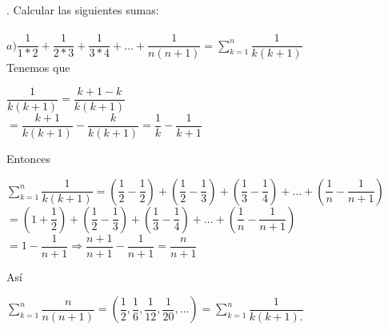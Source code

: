 \documentclass[12pt,a4paper,scrartcl]{article}
\begin{document}
{. Calcular las siguientes sumas:\\
\\$\displaystyle a)\dfrac{1}{1*2}+\dfrac{1}{2*3}+\dfrac{1}{3*4}+\ldots+\dfrac{1}{n(n+1)} =\sum_{k=1}^{n}\dfrac{1}{k(k+1)}$\\

Tenemos que \\\vspace{1em}
\begin{center}
$\dfrac{1}{k(k+1)}=\dfrac{k+1-k}{k(k+1)}$\\\vspace{1em}
$=\dfrac{k+1}{k(k+1)}-\dfrac{k}{k(k+1)}= \dfrac{1}{k}-\dfrac{1}{k+1}$\\
\end{center}
Entonces
\begin{center}
$\displaystyle
\sum_{k=1}^{n}\dfrac{1}{k(k+1)}=(\dfrac{1}{2}-\dfrac{1}{2})+(\dfrac{1}{2}-\dfrac{1}{3})+(\dfrac{1}{3}-\dfrac{1}{4})+\ldots+(\dfrac{1}{n}-\dfrac{1}{n+1})$\\\vspace{1em}
$=(1+\dfrac{1}{2})+(\dfrac{1}{2}-\dfrac{1}{3})+(\dfrac{1}{3}-\dfrac{1}{4})+\ldots+(\dfrac{1}{n}-\dfrac{1}{n+1})$\\\vspace{1em}
$=1-\dfrac{1}{n+1} \Rightarrow \dfrac{n+1}{n+1}-\dfrac{1}{n+1}=\dfrac{n}{n+1}$
\end{center}
As\'i
\begin{center}
$\displaystyle
\sum_{k=1}^{n}\dfrac{n}{n(n+1)}=(\dfrac{1}{2},\dfrac{1}{6},\dfrac{1}{12},\dfrac{1}{20},\ldots) = \sum_{k=1}^{n}\dfrac{1}{k(k+1).}$
\end{center}

}
\end{document}
